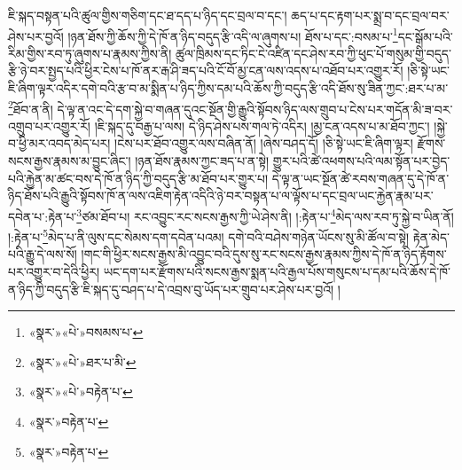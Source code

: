 ཇི་སྐད་བསྟན་པའི་ཚུལ་གྱིས་གཅིག་དང་ཐ་དད་པ་ཉིད་དང་བྲལ་བ་དང་། ཆད་པ་དང་རྟག་པར་སྨྲ་བ་དང་བྲལ་བར་ཤེས་པར་བྱའོ། །ཉན་ཐོས་ཀྱི་ཆོས་ཀྱི་དེ་ཁོ་ན་ཉིད་བདུད་རྩི་འདི་ལ་ཞུགས་པ། ཐོས་པ་དང་:བསམ་པ་\footnote{«སྣར་»«པེ་»བསམས་པ་}དང་སྒོམ་པའི་རིམ་གྱིས་རབ་ཏུ་ཞུགས་པ་རྣམས་ཀྱིས་ནི། ཚུལ་ཁྲིམས་དང་ཏིང་ངེ་འཛིན་དང་ཤེས་རབ་ཀྱི་ཕུང་པོ་གསུམ་གྱི་བདུད་རྩི་ཉེ་བར་སྤྱད་པའི་ཕྱིར་ངེས་པ་ཁོ་ནར་རྒ་ཤི་ཟད་པའི་ངོ་བོ་མྱ་ངན་ལས་འདས་པ་འཐོབ་པར་འགྱུར་རོ། །ཅི་སྟེ་ཡང་ཇི་ཞིག་ལྟར་འདིར་དགེ་བའི་རྩ་བ་མ་སྨིན་པ་ཉིད་ཀྱིས་དམ་པའི་ཆོས་ཀྱི་བདུད་རྩི་འདི་ཐོས་སུ་ཟིན་ཀྱང་:ཐར་པ་མ་\footnote{«སྣར་»«པེ་»ཐར་པ་མི་}ཐོབ་ན་ནི། དེ་ལྟ་ན་འང་དེ་དག་སྐྱེ་བ་གཞན་དུའང་སྔོན་གྱི་རྒྱུའི་སྟོབས་ཉིད་ལས་གྲུབ་པ་ངེས་པར་གདོན་མི་ཟ་བར་འགྲུབ་པར་འགྱུར་རོ། །ཇི་སྐད་དུ་བརྒྱ་པ་ལས། དེ་ཉིད་ཤེས་པས་གལ་ཏེ་འདིར། །མྱ་ངན་འདས་པ་མ་ཐོབ་ཀྱང་། །སྐྱེ་བ་ཕྱི་མར་འབད་མེད་པར། །ངེས་པར་ཐོབ་འགྱུར་ལས་བཞིན་ནོ། །ཞེས་བཤད་དོ། །ཅི་སྟེ་ཡང་ཇི་ཞིག་ལྟར། རྫོགས་སངས་རྒྱས་རྣམས་མ་བྱུང་ཞིང་། །ཉན་ཐོས་རྣམས་ཀྱང་ཟད་པ་ན་སྟེ། གྱུར་པའི་ཚེ་འཕགས་པའི་ལམ་སྟོན་པར་བྱེད་པའི་རྐྱེན་མ་ཚང་བས་དེ་ཁོ་ན་ཉིད་ཀྱི་བདུད་རྩི་མ་ཐོབ་པར་གྱུར་པ། དེ་ལྟ་ན་ཡང་སྔོན་ཚེ་རབས་གཞན་དུ་དེ་ཁོ་ན་ཉིད་ཐོས་པའི་རྒྱུའི་སྟོབས་ཁོ་ན་ལས་འཇིག་རྟེན་འདིའི་ཉེ་བར་བསྟན་པ་ལ་ལྟོས་པ་དང་བྲལ་ཡང་རྐྱེན་རྣམ་པར་དབེན་པ་:རྟེན་པ་\footnote{«སྣར་»«པེ་»བརྟེན་པ་}ཙམ་ཐོབ་པ། རང་འབྱུང་རང་སངས་རྒྱས་ཀྱི་ཡེ་ཤེས་ནི། །:རྟེན་པ་\footnote{«སྣར་»བརྟེན་པ་}མེད་ལས་རབ་ཏུ་སྐྱེ་བ་ཡིན་ནོ། །:རྟེན་པ་\footnote{«སྣར་»བརྟེན་པ་}མེད་པ་ནི་ལུས་དང་སེམས་དག་དབེན་པའམ། དགེ་བའི་བཤེས་གཉེན་ཡོངས་སུ་མི་ཚོལ་བ་སྟེ། རྟེན་མེད་པའི་རྒྱུ་དེ་ལས་སོ། །གང་གི་ཕྱིར་སངས་རྒྱས་མི་འབྱུང་བའི་དུས་སུ་རང་སངས་རྒྱས་རྣམས་ཀྱིས་དེ་ཁོ་ན་ཉིད་རྟོགས་པར་འགྱུར་བ་དེའི་ཕྱིར། ཡང་དག་པར་རྫོགས་པའི་སངས་རྒྱས་སྨན་པའི་རྒྱལ་པོས་གསུངས་པ་དམ་པའི་ཆོས་དེ་ཁོ་ན་ཉིད་ཀྱི་བདུད་རྩི་ཇི་སྐད་དུ་བཤད་པ་དེ་འབྲས་བུ་ཡོད་པར་གྲུབ་པར་ཤེས་པར་བྱའོ། །
